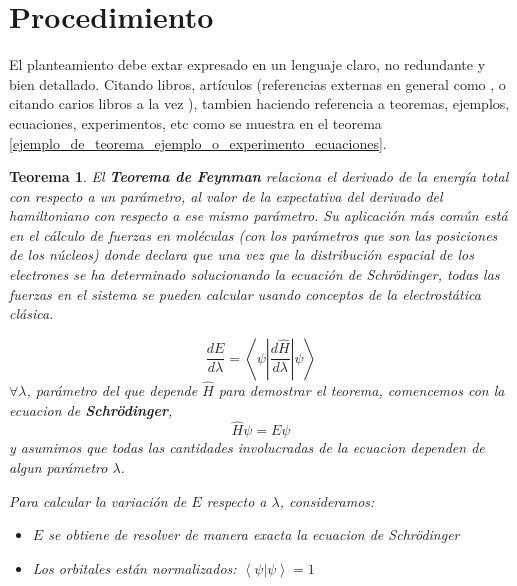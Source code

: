 \documentclass[a4paper]{IEEEtran} %
\newtheorem{teor}{Teorema}[section] %
\begin{document}
\section{Procedimiento}
\label{procedimiento}

El planteamiento debe extar expresado en un lenguaje claro, no redundante y bien detallado. Citando libros, artículos (referencias externas en general como \cite{libro1} , o citando carios libros a la vez \cite{libro4, libro5, libro6}), tambien haciendo referencia a teoremas, ejemplos, ecuaciones, experimentos, etc como se muestra en el teorema \eqref{ejemplo_de_teorema_ejemplo_o_experimento_ecuaciones}.

\begin{teor}
\rm %
\label{ejemplo_de_teorema_ejemplo_o_experimento_ecuaciones}
El \textbf{Teorema de Feynman} relaciona el derivado de la energía total con respecto a un parámetro, al valor de la expectativa del derivado del hamiltoniano con respecto a ese mismo parámetro. Su aplicación más común está en el cálculo de fuerzas en moléculas (con los parámetros que son las posiciones de los núcleos) donde declara que una vez que la distribución espacial de los electrones se ha determinado solucionando la ecuación de Schrödinger, todas las fuerzas en el sistema se pueden calcular usando conceptos de la electrostática clásica.

\begin{equation}
\frac{dE}{d \lambda} = \left\langle \psi \left| \frac{d \widehat{H}}{d \lambda} \right| \psi \right\rangle
\end{equation}
$\forall \lambda$, parámetro del que depende $\widehat{H}$
para demostrar el teorema, comencemos con la ecuacion de \textbf{Schrödinger},
\begin{equation*}
\widehat{H} \psi = E \psi
\end{equation*}
y asumimos que todas las cantidades involucradas de la ecuacion dependen de algun parámetro $\lambda$.

Para calcular la variación de $E$ respecto a $\lambda$, consideramos:

\begin{itemize}
\item $E$ se obtiene de resolver de manera exacta la ecuacion de Schrödinger
\item Los orbitales están normalizados: $\left\langle \psi | \psi \right\rangle= 1$
\end{itemize}


\end{teor}
\end{document}

